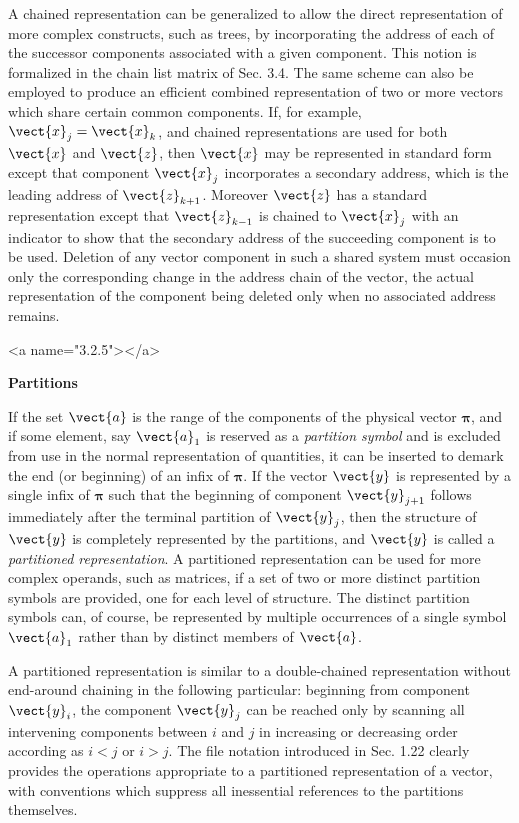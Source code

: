 {\par A chained representation can be generalized to allow the direct representation of more complex constructs, such as trees, by incorporating the address of each of the successor components associated with a given component. This notion is formalized in the chain list matrix of Sec. 3.4. The same scheme can also be employed to produce an efficient combined representation of two or more vectors which share certain common components. If, for example, $\vect{x}_j = \vect{x}_k$, and chained representations are used for both $\vect{x}$ and $\vect{z}$, then $\vect{x}$ may be represented in standard form except that component $\vect{x}_j$ incorporates a secondary address, which is the leading address of $\vect{z}_{k+1}$. Moreover $\vect{z}$ has a standard representation except that $\vect{z}_{k-1}$ is chained to $\vect{x}_j$ with an indicator to show that the secondary address of the succeeding component is to be used. Deletion of any vector component in such a shared system must occasion only the corresponding change in the address chain of the vector, the actual representation of the component being deleted only when no associated address remains.

<a name="3.2.5"></a>
\par \textbf{Partitions}

\par If the set $\vect{a}$ is the range of the components of the physical vector $\mathbf{π}$, and if some element, say $\vect{a}_1$ is reserved as a \textit{partition symbol} and is excluded from use in the normal representation of quantities, it can be inserted to demark the end (or beginning) of an infix of $\mathbf{π}$. If the vector $\vect{y}$ is represented by a single infix of $\mathbf{π}$ such that the beginning of component $\vect{y}_{j+1}$ follows immediately after the terminal partition of $\vect{y}_j$, then the structure of $\vect{y}$ is completely represented by the partitions, and $\vect{y}$ is called a \textit{partitioned representation}. A partitioned representation can be used for more complex operands, such as matrices, if a set of two or more distinct partition symbols are provided, one for each level of structure. The distinct partition symbols can, of course, be represented by multiple occurrences of a single symbol $\vect{a}_1$ rather than by distinct members of $\vect{a}$.

\par A partitioned representation is similar to a double-chained representation without end-around chaining in the following particular: beginning from component $\vect{y}_i$, the component $\vect{y}_j$ can be reached only by scanning all intervening components between $i$ and $j$ in increasing or decreasing order according as $i < j$ or $i > j$. The file notation introduced in Sec. 1.22 clearly provides the operations appropriate to a partitioned representation of a vector, with conventions which suppress all inessential references to the partitions themselves.

}
